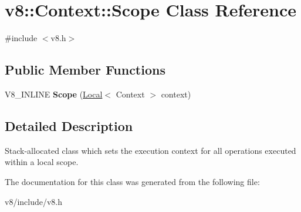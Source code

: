 \hypertarget{classv8_1_1Context_1_1Scope}{}\section{v8\+:\+:Context\+:\+:Scope Class Reference}
\label{classv8_1_1Context_1_1Scope}


{\ttfamily \#include $<$v8.\+h$>$}

\subsection*{Public Member Functions}
\begin{DoxyCompactItemize}
\item 
\mbox{\label{classv8_1_1Context_1_1Scope_a3c7ec79eb92ab9bb2784e4ff0c5557c1}} 
V8\+\_\+\+I\+N\+L\+I\+NE {\bfseries Scope} (\mbox{\hyperlink{classv8_1_1Local}{Local}}$<$ Context $>$ context)
\end{DoxyCompactItemize}


\subsection{Detailed Description}
Stack-\/allocated class which sets the execution context for all operations executed within a local scope. 

The documentation for this class was generated from the following file\+:\begin{DoxyCompactItemize}
\item 
v8/include/v8.\+h\end{DoxyCompactItemize}
